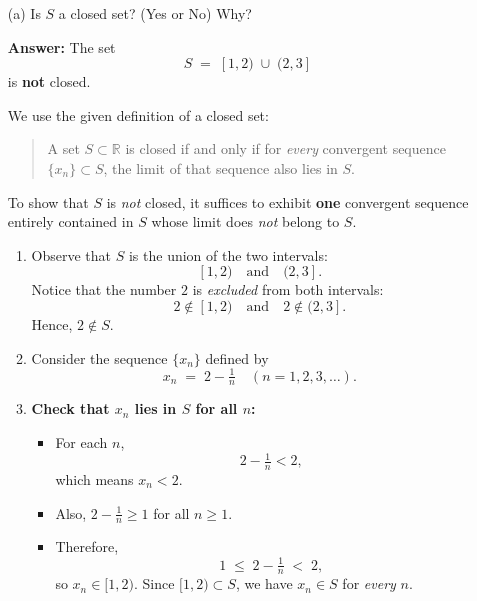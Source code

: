 \documentclass[12pt]{article}
\begin{document}
\begin{enumerate}
    \item[(a)] Is \(S\) a closed set? (Yes or No) Why?
    
    \textbf{Answer:} The set
    \[
    S \;=\; [1,2) \;\cup\; (2,3]
    \]
    is \textbf{not} closed.
    
    \hrulefill
        
    We use the given definition of a closed set:
    
    \begin{quote}
    A set \( S \subset \mathbb{R} \) is closed if and only if for \textit{every} convergent sequence \( \{x_n\} \subset S \), the limit of that sequence also lies in \( S \).
    \end{quote}
    
    To show that \( S \) is \textit{not} closed, it suffices to exhibit \textbf{one} convergent sequence entirely contained in \( S \) whose limit does \textit{not} belong to \( S \).
    
    \hrulefill
    
    
    \begin{enumerate}
        \item Observe that \( S \) is the union of the two intervals:
        \[
        [1,2) \quad \text{and} \quad (2,3].
        \]
        Notice that the number \( 2 \) is \textit{excluded} from both intervals:
        \[
        2 \notin [1,2) 
        \quad \text{and} \quad 
        2 \notin (2,3].
        \]
        Hence, \( 2 \notin S \).
        
        \item Consider the sequence \( \{x_n\} \) defined by  
        \[
        x_n \;=\; 2 - \tfrac{1}{n} \quad (n = 1, 2, 3, \dots).
        \]
        
        \item \textbf{Check that \( x_n \) lies in \( S \) for all \( n \):}  
        \begin{itemize}
            \item For each \( n \),
            \[
            2 - \tfrac{1}{n} < 2,
            \]
            which means \( x_n < 2 \).
            
            \item Also, \( 2 - \tfrac{1}{n} \geq 1 \) for all \( n \geq 1 \).
            
            \item Therefore,
            \[
            1 \;\leq\; 2 - \tfrac{1}{n} \;<\; 2,
            \]
            so \( x_n \in [1,2) \). Since \( [1,2) \subset S \), we have \( x_n \in S \) for \textit{every} \( n \).
        \end{itemize}
        

\end{enumerate}
\end{enumerate}
\end{document}
